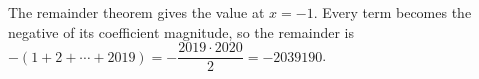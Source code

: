 The remainder theorem gives the value at $x=-1$. Every term becomes the negative of its coefficient magnitude, so the remainder is $-(1+2+\cdots+2019)=-\dfrac{2019\cdot2020}{2}=\boxed{-2039190}$.
